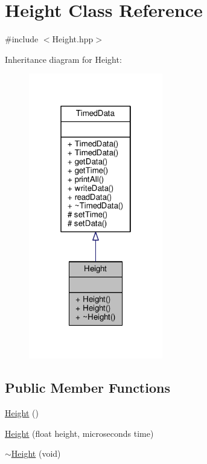 \hypertarget{classHeight}{\section{Height Class Reference}
\label{classHeight}
}


{\ttfamily \#include $<$Height.\+hpp$>$}



Inheritance diagram for Height\+:\nopagebreak
\begin{figure}[H]
\begin{center}
\leavevmode
\includegraphics[width=166pt]{classHeight__inherit__graph}
\end{center}
\end{figure}
\subsection*{Public Member Functions}
\begin{DoxyCompactItemize}
\item 
\hyperlink{classHeight_a7fecf5018a116f8234513b222bae6a2f}{Height} ()
\item 
\hyperlink{classHeight_ab715608c84ce45a0a9bb2e241e952312}{Height} (float height, microseconds time)
\item 
\hyperlink{classHeight_a8173b5ed640978f40eb13203b8509581}{$\sim$\+Height} (void)
\end{DoxyCompactItemize}
